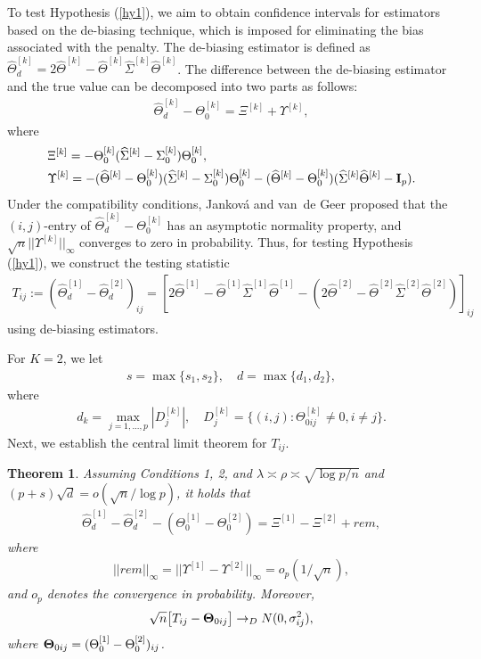 \documentclass[review]{elsarticle}
\newcommand{\bbI}{{\bf I}}
\newcommand{\1}{{\bf 1}}
\newcommand{\0}{{\bf 0}}
\newcommand{\bqa}{\begin{eqnarray}}
\newcommand{\eqa}{\end{eqnarray}}
\newtheorem{thm}{Theorem}
\begin{document}
 To test Hypothesis (\ref{hy1}), we aim to obtain confidence intervals for estimators based on the de-biasing technique, which is imposed for eliminating the bias associated with the penalty.
 The de-biasing estimator is defined as $\widehat{{\Theta}}^{[k]}_d=2\widehat{\Theta}^{[k]}-\widehat{\Theta}^{[k]}
\widehat{\Sigma}^{[k]}\widehat{\Theta}^{[k]}$.
 The difference between the de-biasing estimator and the true value can be decomposed into two parts as follows:
\bqa
\widehat{{\Theta}}^{[k]}_d-\Theta_0^{[k]}=\Xi^{[k]}+\Upsilon^{[k]},
\eqa
 where
\bqa
&\Xi^{[k]}=-\Theta_0^{[k]}
(\widehat{\Sigma}^{[k]}-\Sigma^{[k]}_0)\Theta_0^{[k]},\\
&\Upsilon^{[k]}=-(\widehat{\Theta}^{[k]}-\Theta_0^{[k]})
 (\widehat{\Sigma}^{[k]}-\Sigma_0^{[k]})\Theta_0^{[k]}-(\widehat{\Theta}^{[k]}-\Theta_0^{[k]})
 (\widehat{\Sigma}^{[k]}\widehat{\Theta}^{[k]}-\bbI_p).
\eqa
 Under the compatibility conditions, Jankov{\'a} and van~de Geer \cite{jankova2018inference} proposed that the $(i,j)$-entry of $\widehat{{\Theta}}^{[k]}_d-\Theta_0^{[k]}$ has an asymptotic normality property, and $\sqrt{n}||\Upsilon^{[k]}||_{\infty}$ converges to zero in probability.
 Thus, for testing Hypothesis (\ref{hy1}), we construct the testing statistic
\bqa\label{teststa}
T_{ij}:=\left(\widehat{{\Theta}}_{d}^{[1]}-\widehat{{\Theta}}_{d}^{[2]}\right)_{ij}=\left[2\widehat{\Theta}^{[1]}-\widehat{\Theta}^{[1]}
\widehat{\Sigma}^{[1]}\widehat{\Theta}^{[1]}-(2\widehat{\Theta}^{[2]}-\widehat{\Theta}^{[2]}
\widehat{\Sigma}^{[2]}\widehat{\Theta}^{[2]})\right]_{ij}
\eqa
using de-biasing estimators.

For $K=2$, we let
\bqa
s=\max\{s_1,s_2\},\quad d=\max\{d_1,d_2\},
\eqa
 where
\bqa
d_k=\max_{j=1,...,p}|D_{j}^{[k]}|,\quad D_{j}^{[k]}=\{(i,j):\Theta^{[k]}_{0ij}\neq 0,i\neq j\}.
\eqa
 Next, we establish the central limit theorem for $T_{ij}$.

\begin{thm}\label{CLT}
Assuming Conditions 1, 2, and $\lambda\asymp \rho\asymp \sqrt{\log p/n}$ and $(p+s)\sqrt{d}=o(\sqrt{n}/\log p)$,
 it holds that
\bqa\label{linear}
\widehat{{\Theta}}^{[1]}_d-\widehat{{\Theta}}^{[2]}_d-(\Theta_0^{[1]}-\Theta_0^{[2]})=\Xi^{[1]}-\Xi^{[2]}
+rem,
\eqa
 where
\bqa
||rem||_{\infty}=||\Upsilon^{[1]}-\Upsilon^{[2]}||_{\infty}=o_{p}(1/\sqrt{n}),
\eqa
and $o_p$ denotes the convergence in probability. Moreover,
\bqa
\sqrt{n}\big[T_{ij}-{\bf \Theta}_{0ij}\big]\to_{D}N(0,\sigma_{ij}^2),
\eqa
 where ${\bf \Theta}_{0ij}=(\Theta_0^{[1]}-\Theta_0^{[2]})_{ij}$.
\end{thm}
\end{document}
